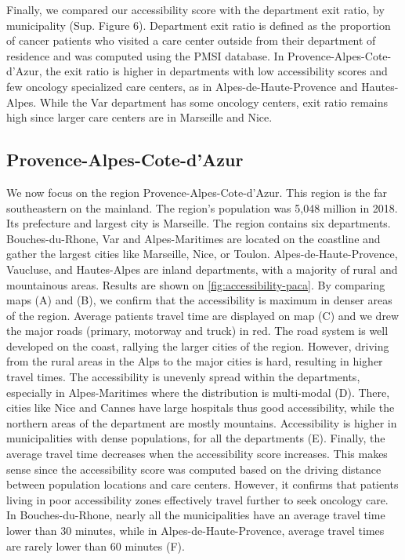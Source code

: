 Finally, we compared our accessibility score with the department exit ratio, by municipality (Sup. Figure 6). Department exit ratio is defined as the proportion of cancer patients who visited a care center outside from their department of residence and was computed using the PMSI database. In Provence-Alpes-Cote-d'Azur, the exit ratio is higher in departments with low accessibility scores and few oncology specialized care centers, as in Alpes-de-Haute-Provence and Hautes-Alpes. While the Var department has some oncology centers, exit ratio remains high since larger care centers are in Marseille and Nice.

\subsection{Provence-Alpes-Cote-d'Azur}

We now focus on the region Provence-Alpes-Cote-d'Azur. This region is the far southeastern on the mainland. The region's population was 5,048 million in 2018. Its prefecture and largest city is Marseille. The region contains six departments. Bouches-du-Rhone, Var and Alpes-Maritimes are located on the coastline and gather the largest cities like Marseille, Nice, or Toulon. Alpes-de-Haute-Provence, Vaucluse, and Hautes-Alpes are inland departments, with a majority of rural and mountainous areas. Results are shown on \cref{fig:accessibility-paca}. By comparing maps (A) and (B), we confirm that the accessibility is maximum in denser areas of the region. Average patients travel time are displayed on map (C) and we drew the major roads (primary, motorway and truck) in red. The road system is well developed on the coast, rallying the larger cities of the region. However, driving from the rural areas in the Alps to the major cities is hard, resulting in higher travel times. The accessibility is unevenly spread within the departments, especially in Alpes-Maritimes where the distribution is multi-modal (D). There, cities like Nice and Cannes have large hospitals thus good accessibility, while the northern areas of the department are mostly mountains. Accessibility is higher in municipalities with dense populations, for all the departments (E). Finally, the average travel time decreases when the accessibility score increases. This makes sense since the accessibility score was computed based on the driving distance between population locations and care centers. However, it confirms that patients living in poor accessibility zones effectively travel further to seek oncology care. In Bouches-du-Rhone, nearly all the municipalities have an average travel time lower than 30 minutes, while in Alpes-de-Haute-Provence, average travel times are rarely lower than 60 minutes (F).

